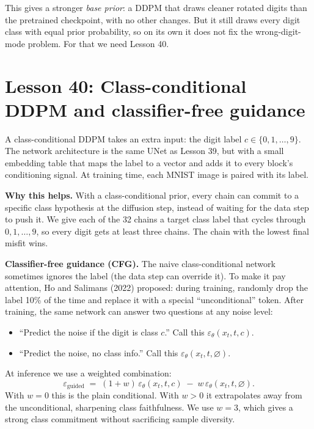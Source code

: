 \documentclass[11pt]{article}
\begin{document}
This gives a stronger \emph{base prior}: a DDPM that draws cleaner
rotated digits than the pretrained checkpoint, with no other changes.
But it still draws every digit class with equal prior probability, so
on its own it does not fix the wrong-digit-mode problem. For that we
need Lesson 40.

\section{Lesson 40: Class-conditional DDPM and classifier-free guidance}

A class-conditional DDPM takes an extra input: the digit label
$c \in \{0, 1, \dots, 9\}$. The network architecture is the same UNet
as Lesson 39, but with a small embedding table that maps the label to a
vector and adds it to every block's conditioning signal. At training
time, each MNIST image is paired with its label.

\textbf{Why this helps.} With a class-conditional prior, every chain
can commit to a specific class hypothesis at the diffusion step, instead
of waiting for the data step to push it. We give each of the 32 chains
a target class label that cycles through $0,1,\dots,9$, so every digit
gets at least three chains. The chain with the lowest final misfit wins.

\textbf{Classifier-free guidance (CFG).} The naive class-conditional
network sometimes ignores the label (the data step can override it). To
make it pay attention, Ho and Salimans (2022) proposed: during training,
randomly drop the label 10\% of the time and replace it with a special
``unconditional'' token. After training, the same network can answer two
questions at any noise level:
\begin{itemize}[leftmargin=2em]
\item ``Predict the noise if the digit is class $c$.'' Call this
  $\varepsilon_\theta(x_t, t, c)$.
\item ``Predict the noise, no class info.'' Call this
  $\varepsilon_\theta(x_t, t, \varnothing)$.
\end{itemize}
At inference we use a weighted combination:
\[
\varepsilon_{\text{guided}}
\;=\;
(1 + w)\,\varepsilon_\theta(x_t, t, c)
\;-\;
w\,\varepsilon_\theta(x_t, t, \varnothing).
\]
With $w = 0$ this is the plain conditional. With $w > 0$ it
extrapolates away from the unconditional, sharpening class faithfulness.
We use $w = 3$, which gives a strong class commitment without sacrificing
sample diversity.
\end{document}
